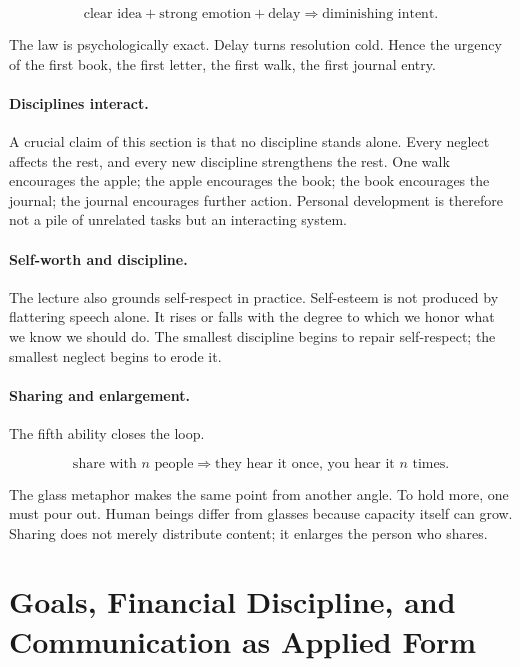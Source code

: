 \begin{equation}
\text{clear idea}+\text{strong emotion}+\text{delay}\Rightarrow \text{diminishing intent}.
\end{equation}

The law is psychologically exact. Delay turns resolution cold. Hence the urgency of the first book, the first letter, the first walk, the first journal entry.

\paragraph{Disciplines interact.}
A crucial claim of this section is that no discipline stands alone. Every neglect affects the rest, and every new discipline strengthens the rest. One walk encourages the apple; the apple encourages the book; the book encourages the journal; the journal encourages further action. Personal development is therefore not a pile of unrelated tasks but an interacting system.

\paragraph{Self-worth and discipline.}
The lecture also grounds self-respect in practice. Self-esteem is not produced by flattering speech alone. It rises or falls with the degree to which we honor what we know we should do. The smallest discipline begins to repair self-respect; the smallest neglect begins to erode it.

\paragraph{Sharing and enlargement.}
The fifth ability closes the loop.

\begin{equation}
\text{share with }n\text{ people} \Rightarrow \text{they hear it once, you hear it }n\text{ times}.
\end{equation}

The glass metaphor makes the same point from another angle. To hold more, one must pour out. Human beings differ from glasses because capacity itself can grow. Sharing does not merely distribute content; it enlarges the person who shares.

\section{Goals, Financial Discipline, and Communication as Applied Form}


